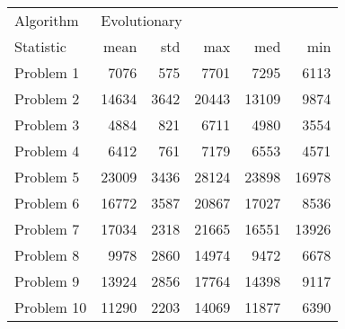 \begin{tabular}{lrrrrr}
\toprule
Algorithm & \multicolumn{5}{l}{Evolutionary} \\
Statistic &         mean &   std &    max &    med &    min \\
\midrule
Problem 1  &         7076 &   575 &   7701 &   7295 &   6113 \\
Problem 2  &        14634 &  3642 &  20443 &  13109 &   9874 \\
Problem 3  &         4884 &   821 &   6711 &   4980 &   3554 \\
Problem 4  &         6412 &   761 &   7179 &   6553 &   4571 \\
Problem 5  &        23009 &  3436 &  28124 &  23898 &  16978 \\
Problem 6  &        16772 &  3587 &  20867 &  17027 &   8536 \\
Problem 7  &        17034 &  2318 &  21665 &  16551 &  13926 \\
Problem 8  &         9978 &  2860 &  14974 &   9472 &   6678 \\
Problem 9  &        13924 &  2856 &  17764 &  14398 &   9117 \\
Problem 10 &        11290 &  2203 &  14069 &  11877 &   6390 \\
\bottomrule
\end{tabular}
